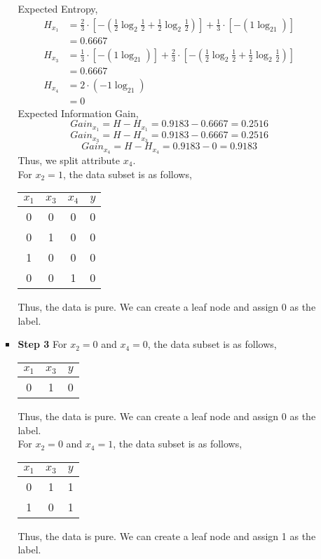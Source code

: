 \documentclass[12pt, fullpage,letterpaper]{article}
\begin{document}
\begin{enumerate}
\begin{enumerate}
\begin{itemize}
Expected Entropy,
\begin{align*}
H_{x_1}&=\frac{2}{3} \cdot [-(\frac{1}{2}\log_2\frac{1}{2}+\frac{1}{2}\log_2\frac{1}{2})] + \frac{1}{3} \cdot [-(1\log_21)]\\
&=0.6667\\
H_{x_3}&=\frac{1}{3} \cdot [-(1\log_21)] + \frac{2}{3} \cdot [-(\frac{1}{2}\log_2\frac{1}{2}+\frac{1}{2}\log_2\frac{1}{2})]\\
&=0.6667\\
H_{x_4}&=2\cdot(-1\log_21)\\
&=0
\end{align*}
Expected Information Gain,
$$Gain_{x_1}=H-H_{x_1}=0.9183-0.6667=0.2516$$
$$Gain_{x_3}=H-H_{x_3}=0.9183-0.6667=0.2516$$
$$Gain_{x_4}=H-H_{x_4}=0.9183-0=0.9183$$
Thus, we split attribute $x_4$.\\
For $x_2=1$, the data subset is as follows,
\begin{table}[H]
\centering
\begin{tabular}{ccc|c}
$x_1$&$x_3$&$x_4$&$y$\\
\hline \hline
0&0&0&0\\
0&1&0&0\\
1&0&0&0\\
0&0&1&0\\
\end{tabular}
\end{table}
Thus, the data is pure. We can create a leaf node and assign 0 as the label.
\item \textbf{Step 3}
For $x_2=0$ and $x_4=0$, the data subset is as follows,
\begin{table}[H]
\centering
\begin{tabular}{cc|c}
$x_1$&$x_3$&$y$\\
\hline \hline
0&1&0\\
\end{tabular}
\end{table}
Thus, the data is pure. We can create a leaf node and assign 0 as the label.\\
For $x_2=0$ and $x_4=1$, the data subset is as follows,
\begin{table}[H]
\centering
\begin{tabular}{cc|c}
$x_1$&$x_3$&$y$\\
\hline \hline
0&1&1\\
1&0&1\\
\end{tabular}
\end{table}
Thus, the data is pure. We can create a leaf node and assign 1 as the label.\\\\

\end{itemize}
\end{enumerate}
\end{enumerate}
\end{document}

